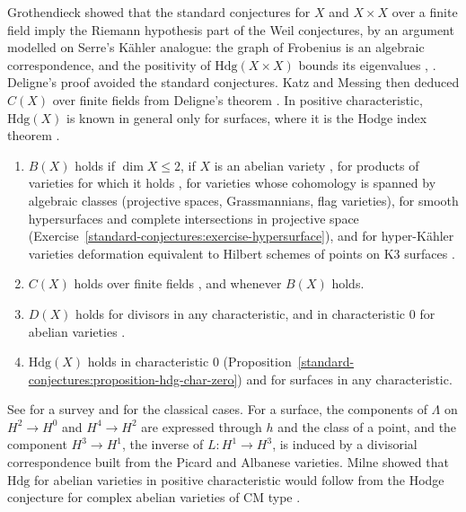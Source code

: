\begin{remark}\label{standard-conjectures:remark-grothendieck-plan}
Grothendieck showed that the standard conjectures for $X$ and $X \times X$ over a finite field imply the Riemann hypothesis part of the Weil conjectures, by an argument modelled on Serre's K\"ahler analogue:
the graph of Frobenius is an algebraic correspondence, and the positivity of $\mathrm{Hdg}(X \times X)$ bounds its eigenvalues \cite{grothendieck-standard}, \cite{kleiman-1968}. Deligne's proof
\cite{deligne-weil-1} avoided the standard conjectures. Katz and Messing then deduced $C(X)$ over finite fields from Deligne's theorem \cite{katz-messing-1974}. In positive characteristic,
$\mathrm{Hdg}(X)$ is known in general only for surfaces, where it is the Hodge index theorem \cite[Theorem V.1.9]{hartshorne-ag}.
\end{remark}

\begin{theorem}\label{standard-conjectures:theorem-known}
\begin{enumerate}
\item $B(X)$ holds if $\dim X \leq 2$, if $X$ is an abelian variety \cite{lieberman-1968}, for products of varieties for which it holds \cite{kleiman-1968}, for varieties whose cohomology is spanned by algebraic
classes (projective spaces, Grassmannians, flag varieties), for smooth hypersurfaces and complete intersections in projective space (Exercise~\ref{standard-conjectures:exercise-hypersurface}), and for hyper-K\"ahler varieties
deformation equivalent to Hilbert schemes of points on K3 surfaces \cite{charles-markman-2013}.
\item $C(X)$ holds over finite fields \cite{katz-messing-1974}, and whenever $B(X)$ holds.
\item $D(X)$ holds for divisors in any characteristic, and in characteristic $0$ for abelian varieties \cite{lieberman-1968}.
\item $\mathrm{Hdg}(X)$ holds in characteristic $0$ (Proposition~\ref{standard-conjectures:proposition-hdg-char-zero}) and for surfaces in any characteristic.
\end{enumerate}
\end{theorem}

See \cite{kleiman-1994} for a survey and for the classical cases. For a surface, the components of $\Lambda$ on $H^2 \to H^0$ and $H^4 \to H^2$ are expressed through $h$ and the class of a point, and
the component $H^3 \to H^1$, the inverse of $L \colon H^1 \to H^3$, is induced by a divisorial correspondence built from the Picard and Albanese varieties. Milne showed that $\mathrm{Hdg}$ for abelian
varieties in positive characteristic would follow from the Hodge conjecture for complex abelian varieties of CM type \cite{milne-2002}.

